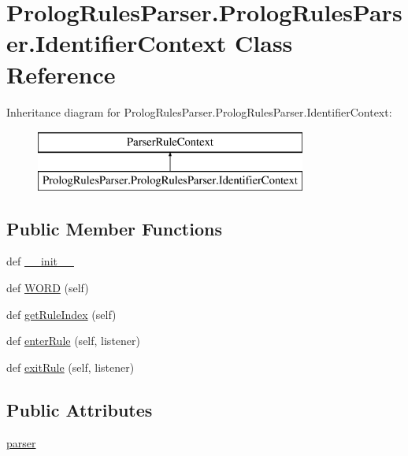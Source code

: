 \hypertarget{class_prolog_rules_parser_1_1_prolog_rules_parser_1_1_identifier_context}{}\section{Prolog\+Rules\+Parser.\+Prolog\+Rules\+Parser.\+Identifier\+Context Class Reference}
\label{class_prolog_rules_parser_1_1_prolog_rules_parser_1_1_identifier_context}
Inheritance diagram for Prolog\+Rules\+Parser.\+Prolog\+Rules\+Parser.\+Identifier\+Context\+:\begin{figure}[H]
\begin{center}
\leavevmode
\includegraphics[height=2.000000cm]{class_prolog_rules_parser_1_1_prolog_rules_parser_1_1_identifier_context}
\end{center}
\end{figure}
\subsection*{Public Member Functions}
\begin{DoxyCompactItemize}
\item 
def \hyperlink{class_prolog_rules_parser_1_1_prolog_rules_parser_1_1_identifier_context_a4e27087e457b0a1a30e267296c0b5d27}{\+\_\+\+\_\+init\+\_\+\+\_\+}
\item 
def \hyperlink{class_prolog_rules_parser_1_1_prolog_rules_parser_1_1_identifier_context_ae0051cb257cc23bb7ba7395229267e54}{W\+O\+R\+D} (self)
\item 
def \hyperlink{class_prolog_rules_parser_1_1_prolog_rules_parser_1_1_identifier_context_a0c78b930d7b0f086af8898f27446003f}{get\+Rule\+Index} (self)
\item 
def \hyperlink{class_prolog_rules_parser_1_1_prolog_rules_parser_1_1_identifier_context_a13773579c93b133bd3d76ae74fb48da4}{enter\+Rule} (self, listener)
\item 
def \hyperlink{class_prolog_rules_parser_1_1_prolog_rules_parser_1_1_identifier_context_a31f5b17b8fb5e23d9c73fa8428babc85}{exit\+Rule} (self, listener)
\end{DoxyCompactItemize}
\subsection*{Public Attributes}
\begin{DoxyCompactItemize}
\item 
\hyperlink{class_prolog_rules_parser_1_1_prolog_rules_parser_1_1_identifier_context_abbd5df64720a0e1958526c13e82fd390}{parser}
\end{DoxyCompactItemize}


